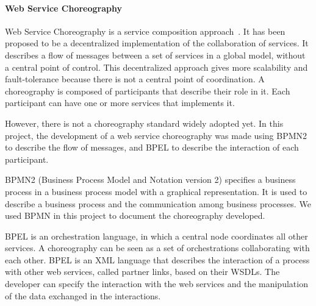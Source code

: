 \paragraph{Web Service Choreography}
Web Service Choreography is a service composition approach~\cite{1236471}. It has been proposed to be a decentralized implementation of the collaboration of services.  It describes a flow of messages between a set of services in a global model, without a central point of control. This decentralized approach gives more scalability and fault-tolerance because there is not a central point of coordination.  A choreography is composed of participants that describe their role in it. Each participant can have one or more services that implements it.

However, there is not a choreography standard widely adopted yet. In this project, the development of a web service choreography was made using BPMN2 to describe the flow of messages, and BPEL to describe the interaction of each participant. 

BPMN2 (Business Process Model and Notation version 2) specifies a business process in a business process model with a graphical representation. It is used to describe a business process and the communication among business processes. We used BPMN in this project to document the choreography developed.

BPEL is an orchestration language, in which a central node coordinates all other services. A choreography can be seen as a set of orchestrations collaborating with each other. BPEL is an XML language that describes the interaction of a process with other web services, called partner links, based on their WSDLs. The developer can specify the interaction with the web services and the manipulation of the data exchanged in the interactions.


